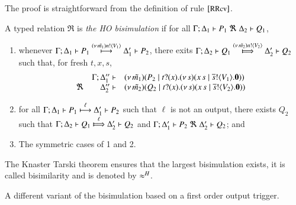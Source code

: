 \begin{IEEEproof}
	The proof is straightforward from the definition of rule $\eltsrule{RRcv}$.
\end{IEEEproof}

\begin{definition}\rm
	\label{d:bisim}
A typed relation $\Re$ is {\em the HO bisimulation} if
for all $\horel{\Gamma}{\Delta_1}{P_1}{\ \Re \ }{\Delta_2}{Q_1}$, 
	\begin{enumerate}
		\item	whenever 
$\Gamma; \Delta_1 \vdash P_1 \stackrel{(\nu\, \tilde{m_1}) n ! \langle V_1 \rangle}{\longmapsto} \Delta_1' \vdash P_2$, there exits 
$\horel{\Gamma}{\Delta_2}{Q_1}{\Hby{\news{\tilde{m_2}} \bactout{n}{V_2}}}{\Delta_2'}{Q_2}$ such that, for fresh $t,x,s$, 
\[
\begin{array}{lrlll}
& \Gamma; \Delta''_1  \vdash & 
{(\nu\, \tilde{m_1})(P_2 \;|\; t ? (x) . (\nu\, s)(x\, {s} \;|\; \overline{s} ! \langle V_1 \rangle . \mathbf{0}))}\\ 
\Re & 
\Delta''_2 \vdash & {(\nu\, \tilde{m_2})(Q_2 \;|\; t ? (x) . (\nu\, s)(x\, {s} \;|\; \overline{s} ! \langle V_2 \rangle . \mathbf{0}))}
\end{array}
\]
		\item	
for all $\Gamma; \Delta_1 \vdash P_1 \stackrel{\ell}{\longmapsto} \Delta_1' \vdash P_2$ such that 
$\ell$ is not an output, 
 there exists $Q_2$ such that 
$\horel{\Gamma}{\Delta_2}{Q_1}{\Hby{\ell}}{\Delta_2'}{Q_2}$
			and
			$\horel{\Gamma}{\Delta_1'}{P_2}{\ \Re \ }{\Delta_2'}{Q_2}$; and 

                      \item	The symmetric cases of 1 and 2.                
	\end{enumerate}
	The Knaster Tarski theorem ensures that the largest bisimulation exists,
	it is called bisimilarity and is denoted by $\approx^H$.
\end{definition}


A different variant of the bisimulation based on a first order
output trigger.

